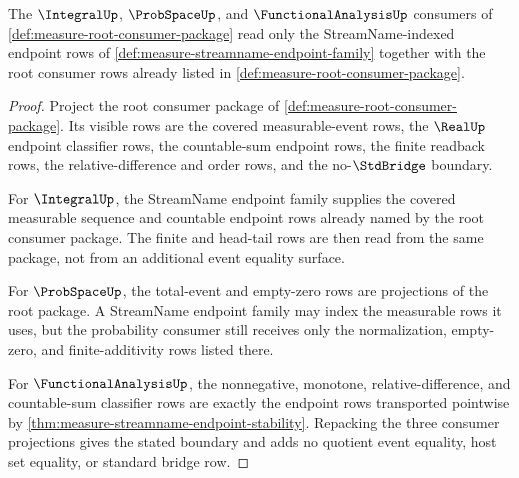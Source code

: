 \begin{theorem}
\label{thm:measure-streamname-downstream-consumer-boundary}
The $\IntegralUp$, $\ProbSpaceUp$, and $\FunctionalAnalysisUp$ consumers of
\autoref{def:measure-root-consumer-package} read only the StreamName-indexed
endpoint rows of \autoref{def:measure-streamname-endpoint-family} together
with the root consumer rows already listed in
\autoref{def:measure-root-consumer-package}.
\end{theorem}
\begin{proof}
Project the root consumer package of
\autoref{def:measure-root-consumer-package}. Its visible rows are the covered
measurable-event rows, the $\RealUp$ endpoint classifier rows, the
countable-sum endpoint rows, the finite readback rows, the relative-difference
and order rows, and the no-$\StdBridge$ boundary.

For $\IntegralUp$, the StreamName endpoint family supplies the covered
measurable sequence and countable endpoint rows already named by the root
consumer package. The finite and head-tail rows are then read from the same
package, not from an additional event equality surface.

For $\ProbSpaceUp$, the total-event and empty-zero rows are projections of the
root package. A StreamName endpoint family may index the measurable rows it
uses, but the probability consumer still receives only the normalization,
empty-zero, and finite-additivity rows listed there.

For $\FunctionalAnalysisUp$, the nonnegative, monotone,
relative-difference, and countable-sum classifier rows are exactly the
endpoint rows transported pointwise by
\autoref{thm:measure-streamname-endpoint-stability}. Repacking the three
consumer projections gives the stated boundary and adds no quotient event
equality, host set equality, or standard bridge row.
\end{proof}
